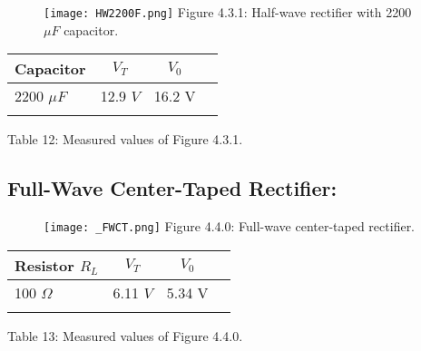 \begin{figure}[H]
\texttt{[image: HW2200F.png]}
\centering \linebreak \linebreak Figure 4.3.1: Half-wave rectifier with 2200 $\mu F$ capacitor.
\end{figure}

\begin{multicols}{2}
\begin{center}
\begin{tabular}[.5cm]{l c c c}
\toprule
Capacitor & $V_{T}$ & $V_{0}$ \\
\midrule
2200 $\mu F$ & 12.9 $V$ &  16.2 V \\
\bottomrule
\linebreak
\end{tabular}
\centering \linebreak Table 12: Measured values of Figure 4.3.1.
\end{center} \hfill

\end{multicols}

\pagebreak

\subsection{Full-Wave Center-Taped Rectifier:}

\begin{figure}[H]
\texttt{[image: \_FWCT.png]}
\centering \linebreak \linebreak Figure 4.4.0: Full-wave center-taped rectifier.
\end{figure}

\begin{multicols}{2}
\begin{center}
\begin{tabular}[.5cm]{l c c c}
\toprule
Resistor $R_{L}$ & $V_{T}$ & $V_{0}$ \\
\midrule
100 $\Omega$ & 6.11 $V$ &  5.34 V \\
\bottomrule
\linebreak
\end{tabular}
\centering \linebreak Table 13: Measured values of Figure 4.4.0.
\end{center} \hfill

\end{multicols}

\pagebreak

